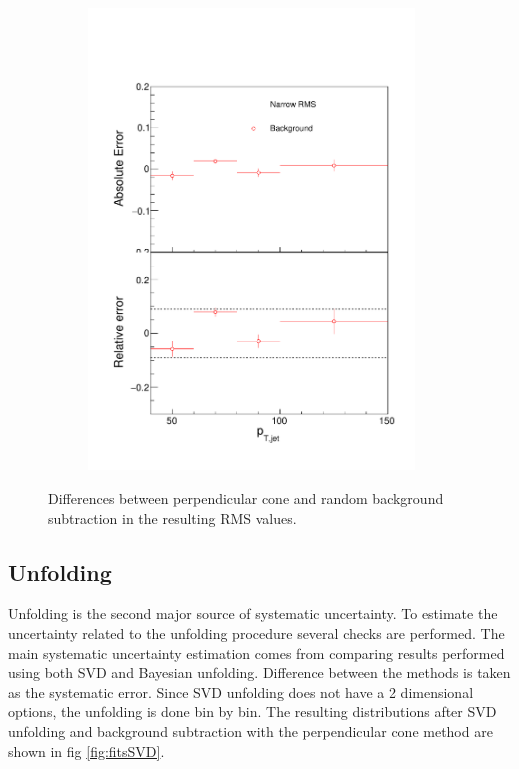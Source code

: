 \begin{figure}
\begin{subfigure}{0.24\textwidth}
\includegraphics[width=0.95\textwidth]{results/SystematicErrors/SystematicErrorsGausRMS_BgNFin00JetPt08_linx_data}
\end{subfigure}
\caption{Differences between perpendicular cone and random background subtraction in the resulting RMS values.}
\label{fig:systbg}
\end{figure}

  
  
  
  \subsection{Unfolding}
Unfolding is the second major source of systematic uncertainty. To estimate the uncertainty related to the unfolding procedure several checks are performed. The main systematic uncertainty estimation comes from comparing results performed using both SVD and Bayesian unfolding. Difference between the methods is taken as the systematic error. Since SVD unfolding does not have a 2 dimensional options, the unfolding is done bin by bin. The resulting distributions after SVD unfolding and background subtraction with the perpendicular cone method are shown in fig \ref{fig:fitsSVD}. 

